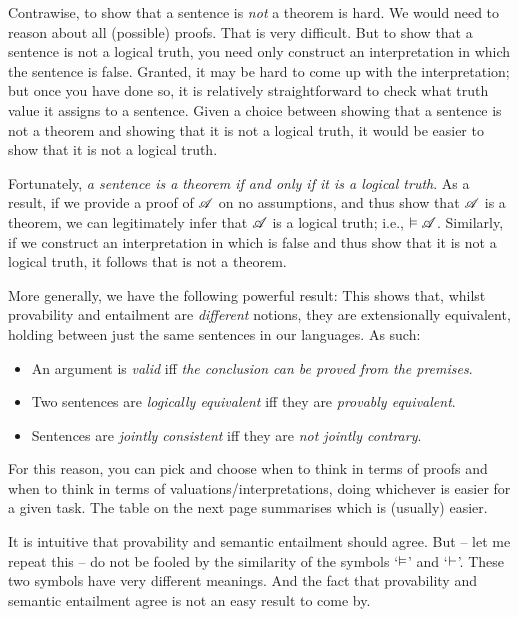 Contrawise, to show that a sentence is \emph{not} a theorem is hard. We would need to reason about all (possible) proofs. That is very difficult. But to show that a sentence is not a logical truth, you need only construct an interpretation in which the sentence is false. Granted, it may be hard to come up with the interpretation; but once you have done so, it is relatively straightforward to check what truth value it assigns to a sentence. Given a choice between showing that a sentence is not a theorem and showing that it is not a logical truth, it would be easier to show that it is not a logical truth.

Fortunately, \emph{a sentence is a theorem if and only if it is a logical truth}. As a result, if we provide a proof of $\mathscr{A}$ on no assumptions, and thus show that $\mathscr{A}$ is a theorem, we can legitimately infer that $\mathscr{A}$ is a logical truth; i.e., $\vDash\mathscr{A}$. Similarly, if we construct an interpretation in which  is false and thus show that it is not a logical truth, it follows that  is not a theorem.

More generally, we have the following powerful result:
This shows that, whilst provability and entailment are \emph{different} notions, they are extensionally equivalent, holding between just the same sentences in our languages. As such:
	\begin{itemize}
		\item An argument is \emph{valid} iff \emph{the conclusion can be proved from the premises}.
		\item Two sentences are \emph{logically equivalent} iff they are \emph{provably equivalent}.
		\item Sentences are \emph{jointly consistent} iff they are \emph{not jointly contrary}.
	\end{itemize}
For this reason, you can pick and choose when to think in terms of proofs and when to think in terms of valuations/interpretations, doing whichever is easier for a given task. The table on the next page summarises which is (usually) easier.

It is intuitive that provability and semantic entailment should agree. But – let me repeat this – do not be fooled by the similarity of the symbols `$\vDash$' and `$\vdash$'. These two symbols have very different meanings. And the fact that provability and semantic entailment agree is not an easy result to come by. 

